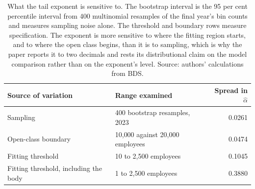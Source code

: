 \begin{table}[H]
\caption{What the tail exponent is sensitive to. The bootstrap interval is the 95 per cent
percentile interval from 400 multinomial resamples of the final year's bin counts and
measures sampling noise alone. The threshold and boundary rows measure specification. The
exponent is more sensitive to where the fitting region starts, and to where the open class
begins, than it is to sampling, which is why the paper reports it to two decimals and rests
its distributional claim on the model comparison rather than on the exponent's level.
Source: authors' calculations from BDS.}
\label{tab:robustness}
\begin{tabular}{llr}
\toprule
Source of variation & Range examined & Spread in $\hat\alpha$ \\
\midrule
Sampling & 400 bootstrap resamples, 2023 & 0.0261 \\
Open-class boundary & 10{,}000 against 20{,}000 employees & 0.0474 \\
Fitting threshold & 10 to 2{,}500 employees & 0.1045 \\
Fitting threshold, including the body & 1 to 2{,}500 employees & 0.3880 \\
\bottomrule
\end{tabular}
\end{table}
